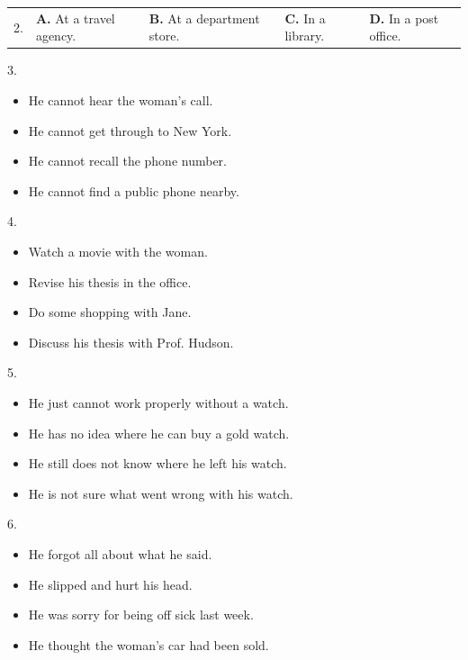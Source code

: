 \documentclass[UTF8,11pt]{ctexart}
\begin{document}
\noindent\begin{tabularx}{\linewidth}{@{}lXXXX@{}}2. & \textbf{A.} At a travel agency. & \textbf{B.} At a department store. & \textbf{C.} In a library. & \textbf{D.} In a post office.\\\end{tabularx}\par

3.


\begin{itemize}[leftmargin=2em,itemsep=.2em,topsep=.4em]\item[A.] He cannot hear the woman’s call.
\item[B.] He cannot get through to New York.
\item[C.] He cannot recall the phone number.
\item[D.] He cannot find a public phone nearby.
\end{itemize}

4.


\begin{itemize}[leftmargin=2em,itemsep=.2em,topsep=.4em]\item[A.] Watch a movie with the woman.
\item[B.] Revise his thesis in the office.
\item[C.] Do some shopping with Jane.
\item[D.] Discuss his thesis with Prof. Hudson.
\end{itemize}

5.


\begin{itemize}[leftmargin=2em,itemsep=.2em,topsep=.4em]\item[A.] He just cannot work properly without a watch.
\item[B.] He has no idea where he can buy a gold watch.
\item[C.] He still does not know where he left his watch.
\item[D.] He is not sure what went wrong with his watch.
\end{itemize}

6.


\begin{itemize}[leftmargin=2em,itemsep=.2em,topsep=.4em]\item[A.] He forgot all about what he said.
\item[B.] He slipped and hurt his head.
\item[C.] He was sorry for being off sick last week.
\item[D.] He thought the woman’s car had been sold.
\end{itemize}
\end{document}
